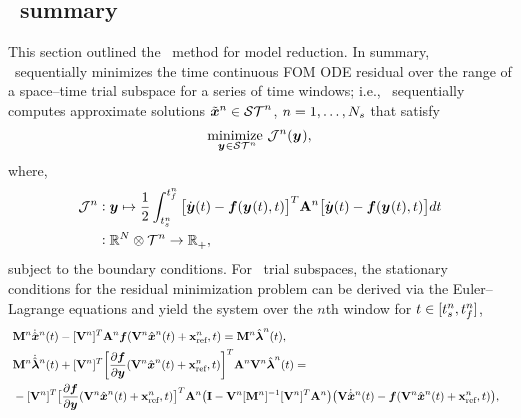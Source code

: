 



\subsection{\methodAcronym\ summary}
This section outlined the \methodAcronym\ method for model reduction. In summary, \methodAcronym\ sequentially minimizes the time continuous FOM ODE residual over the range of a space--time trial subspace for a series of time windows; i.e.,  
\methodAcronym\ sequentially computes approximate solutions
$\approxstateArgnt{n}\in\stspace^n$, $n=1,\ldots,\nslabs$ that satisfy
\begin{equation*}
\underset{\stateyArgnt{} \in \stspace^n}{\text{minimize } }
\mathcal{J}^n(\stateyArgnt{}),
\end{equation*}
where,
\begin{align*}
\mathcal{J}^n &\vcentcolon \statey \mapsto
\frac{1}{2} \int_{\timeStartArg{n}}^{\timeEndArg{n}} \big[ \dot{\statey}(t)
- \velocity(\stateyArg{}{t},t) \big]^T \stweightingMatArg{n} \big[
\dot{\statey}(t) - \velocity(\stateyArg{}{t},t) \big] d t \\
&\vcentcolon \RR{\fomdim}\otimes \timeSpaceArg{n} \rightarrow
\RRplus,
\end{align*}
subject to the boundary conditions. For \spatialAcronym\ trial subspaces, the stationary conditions for the residual minimization problem can be derived via the Euler--Lagrange equations and yield the system over the $n$th window for $t \in [\timeStartArg{n},\timeEndArg{n}]$,
\begin{align*}\
&\massArg{n}  \genstateDotArg{n}{t}  -  \basisspaceTArg{n}
\stweightingMatArgt{n}{t} \velocity(\veloargsromn) =  \massArg{n} \adjointArg{n}{t} , \\
 &\massArg{n} \adjointDotArg{n}{t}  + \basisspaceTArg{n} \bigg[\frac{\partial
\velocity}{\partial \statey} (\veloargsromn) \bigg]^T \stweightingMatArgt{n}{t} \basisspaceArg{n}
 \adjointArg{n}{t} = \nonumber \\ 
&-\basisspaceTArg{n} \big[
\frac{\partial \velocity}{\partial \statey}(\veloargsromn) \big]^T \stweightingMatArgt{n}{t} \big( \mathbf{I} -
\basisspaceArg{n} [\massArg{n}]^{-1} \basisspaceTArg{n} \stweightingMatArgt{n}{t} \big)
 \big( \basisspace \genstateDotArg{n}{t}  -
\velocity(\veloargsromn) \big),  &
\end{align*} 
